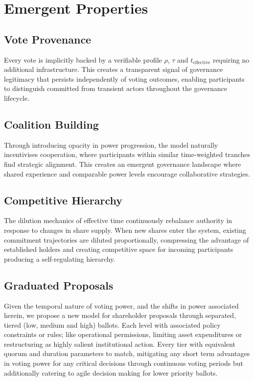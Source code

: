 \documentclass[a4paper,12pt]{article}
\begin{document}
\section{\signifier Emergent Properties}

\subsection{\signifier Vote Provenance}
Every vote is implicitly backed by a verifiable profile $\rho$, $\tau$ and $t_{\text{effective}}$ requiring no additional infrastructure. This creates a transparent signal of governance legitimacy that persists independently of voting outcomes, enabling participants to distinguish committed from transient actors throughout the governance lifecycle.

\subsection{Coalition Building}
Through introducing opacity in power progression, the model naturally incentivises cooperation, where participants within similar time-weighted tranches find strategic alignment. This creates an emergent governance landscape where shared experience and comparable power levels encourage collaborative strategies.  

\subsection{\signifier Competitive Hierarchy}
The dilution mechanics of effective time continuously rebalance authority in response to changes in share supply. When new shares enter the system, existing commitment trajectories are diluted proportionally, compressing the advantage of established holders and creating competitive space for incoming participants producing a self-regulating hierarchy.

\subsection{\signifier Graduated Proposals}
Given the temporal nature of voting power, and the shifts in power associated herein, we propose a new model for shareholder proposals through separated, tiered (low, medium and high) ballots. Each level with associated policy constraints or rules; like operational permissions, limiting asset expenditures or restructuring as highly salient institutional action. Every tier with equivalent quorum and duration parameters to match, mitigating any short term advantages in voting power for any critical decisions through continuous voting periods but additionally catering to agile decision making for lower priority ballots. 
\end{document}
